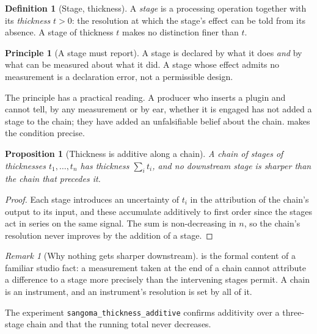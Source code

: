 \documentclass[11pt,twocolumn,a4paper]{article}
\newtheorem{proposition}[theorem]{Proposition}
\theoremstyle{definition}
\newtheorem{definition}[theorem]{Definition}
\newtheorem{principle}[theorem]{Principle}
\theoremstyle{remark}
\newtheorem{remark}[theorem]{Remark}
\newcommand{\thick}{t}
\begin{document}
\begin{definition}[Stage, thickness]
\label{def:stage}
A \emph{stage} is a processing operation together with its \emph{thickness}
$\thick>0$: the resolution at which the stage's effect can be told from its
absence. A stage of thickness $\thick$ makes no distinction finer than $\thick$.
\end{definition}

\begin{principle}[A stage must report]
\label{prin:report}
A stage is declared by what it does \emph{and} by what can be measured about what
it did. A stage whose effect admits no measurement is a declaration error, not a
permissible design.
\end{principle}

The principle has a practical reading. A producer who inserts a plugin and cannot
tell, by any measurement or by ear, whether it is engaged has not added a stage
to the chain; they have added an unfalsifiable belief about the chain.
 makes the condition precise.

\begin{proposition}[Thickness is additive along a chain]
\label{prop:additive}
A chain of stages of thicknesses $\thick_1,\dots,\thick_n$ has thickness
$\sum_i \thick_i$, and no downstream stage is sharper than the chain that
precedes it.
\end{proposition}

\begin{proof}
Each stage introduces an uncertainty of $\thick_i$ in the attribution of the
chain's output to its input, and these accumulate additively to first order since
the stages act in series on the same signal. The sum is non-decreasing in $n$, so
the chain's resolution never improves by the addition of a stage.
\end{proof}

\begin{remark}[Why nothing gets sharper downstream]
\label{rem:no-sharpening}
 is the formal content of a familiar studio fact: a
measurement taken at the end of a chain cannot attribute a difference to a stage
more precisely than the intervening stages permit. A chain is an instrument, and
an instrument's resolution is set by all of it.
\end{remark}

The experiment \texttt{sangoma\_thickness\_additive} confirms additivity over a
three-stage chain and that the running total never decreases.
\end{document}
